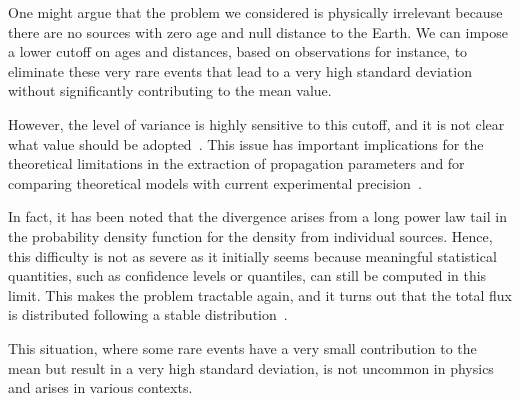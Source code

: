 One might argue that the problem we considered is physically irrelevant because there are no sources with zero age and null distance to the Earth. We can impose a lower cutoff on ages and distances, based on observations for instance, to eliminate these very rare events that lead to a very high standard deviation without significantly contributing to the mean value.

However, the level of variance is highly sensitive to this cutoff, and it is not clear what value should be adopted~\cite{Mertsch2011jcap}. This issue has important implications for the theoretical limitations in the extraction of propagation parameters and for comparing theoretical models with current experimental precision~\cite{Genolini2017aa}.

In fact, it has been noted that the divergence arises from a long power law tail in the probability density function for the density from individual sources. Hence, this difficulty is not as severe as it initially seems because meaningful statistical quantities, such as confidence levels or quantiles, can still be computed in this limit. This makes the problem tractable again, and it turns out that the total flux is distributed following a stable distribution~\cite{Bernard2012aa}.

This situation, where some rare events have a very small contribution to the mean but result in a very high standard deviation, is not uncommon in physics and arises in various contexts.

